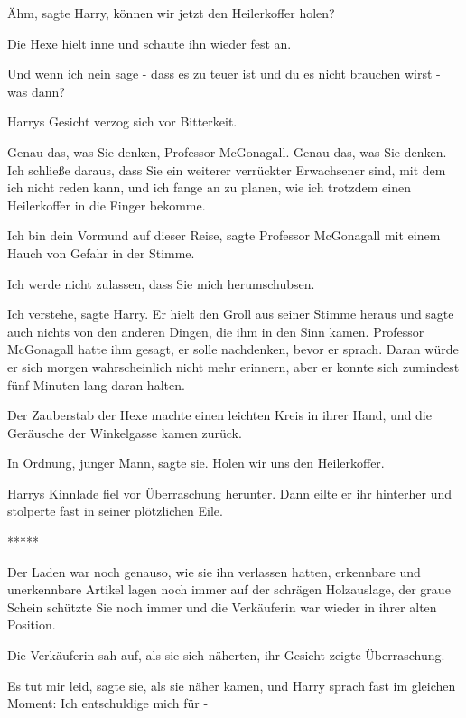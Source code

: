\glqq Ähm\grqq{}, sagte Harry, \glqq können wir jetzt den Heilerkoffer
holen?\grqq{}

Die Hexe hielt inne und schaute ihn wieder fest an.

\glqq Und wenn ich nein sage - dass es zu teuer ist und du es nicht brauchen
wirst - was dann?\grqq{}

Harrys Gesicht verzog sich vor Bitterkeit.

\glqq Genau das, was Sie denken, Professor McGonagall. Genau das, was Sie
denken. Ich schließe daraus, dass Sie ein weiterer verrückter Erwachsener sind,
mit dem ich nicht reden kann, und ich fange an zu planen, wie ich trotzdem einen
Heilerkoffer in die Finger bekomme.\grqq{}

\glqq Ich bin dein Vormund auf dieser Reise\grqq{}, sagte Professor McGonagall
mit einem Hauch von Gefahr in der Stimme.

\glqq Ich werde nicht zulassen, dass Sie mich herumschubsen.\grqq{}

\glqq Ich verstehe\grqq{}, sagte Harry. Er hielt den Groll aus seiner Stimme
heraus und sagte auch nichts von den anderen Dingen, die ihm in den Sinn kamen.
Professor McGonagall hatte ihm gesagt, er solle nachdenken, bevor er sprach.
Daran würde er sich morgen wahrscheinlich nicht mehr erinnern, aber er konnte
sich zumindest fünf Minuten lang daran halten.

Der Zauberstab der Hexe machte einen leichten Kreis in ihrer Hand, und die
Geräusche der Winkelgasse kamen zurück.

\glqq In Ordnung, junger Mann\grqq{}, sagte sie. \glqq Holen wir uns den
Heilerkoffer.\grqq{}

Harrys Kinnlade fiel vor Überraschung herunter. Dann eilte er ihr hinterher und
stolperte fast in seiner plötzlichen Eile.

\begin{center}*****\end{center}

Der Laden war noch genauso, wie sie ihn verlassen hatten, erkennbare und
unerkennbare Artikel lagen noch immer auf der schrägen Holzauslage, der graue
Schein schützte Sie noch immer und die Verkäuferin war wieder in ihrer alten
Position.

Die Verkäuferin sah auf, als sie sich näherten, ihr Gesicht zeigte Überraschung.

\glqq Es tut mir leid\grqq{}, sagte sie, als sie näher kamen, und Harry sprach
fast im gleichen Moment: \glqq Ich entschuldige mich für -\grqq{}

